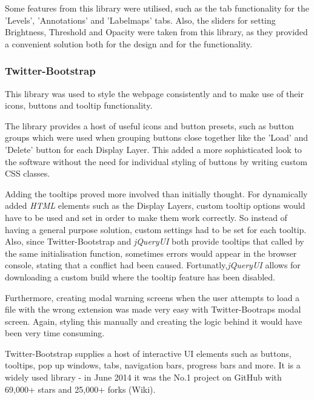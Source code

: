 \documentclass[a4paper,11pt,twoside]{article}
\begin{document}
Some features from this library were utilised, such as the tab functionality for the 'Levels', 'Annotations' and 'Labelmaps' tabs. Also, the sliders for setting Brightness, Threshold and Opacity were taken from this library, as they provided a convenient solution both for the design and for the functionality.


\subsubsection{Twitter-Bootstrap}

This library was used to style the webpage consistently and to make use of their icons, buttons and tooltip functionality.

The library provides a host of useful icons and button presets, such as button groups which were used when grouping buttons close together like the 'Load' and 'Delete' button for each Display Layer. This added a more sophisticated look to the software without the need for individual styling of buttons by writing custom CSS classes.

Adding the tooltips proved more involved than initially thought. For dynamically added \textit{HTML} elements such as the Display Layers, custom tooltip options would have to be used and set in order to make them work correctly. So instead of having a general purpose solution, custom settings had to be set for each tooltip. Also, since Twitter-Bootstrap and \textit{jQueryUI} both provide tooltips that called by the same initialisation function, sometimes errors would appear in the browser console, stating that a conflict had been caused. Fortunatly,\textit{jQueryUI} allows for downloading a custom build where the tooltip feature has been disabled.

Furthermore, creating modal warning screens when the user attempts to load a file with the wrong extension was made very easy with Twitter-Bootraps modal screen. Again, styling this manually and creating the logic behind it would have been very time consuming.

Twitter-Bootstrap supplies a host of interactive UI elements such as buttons, tooltips, pop up windows, tabs, navigation bars, progress bars and more. It is a widely used library - in June 2014 it was the No.1 project on GitHub with 69,000+ stars and 25,000+ forks (Wiki).
\end{document}
